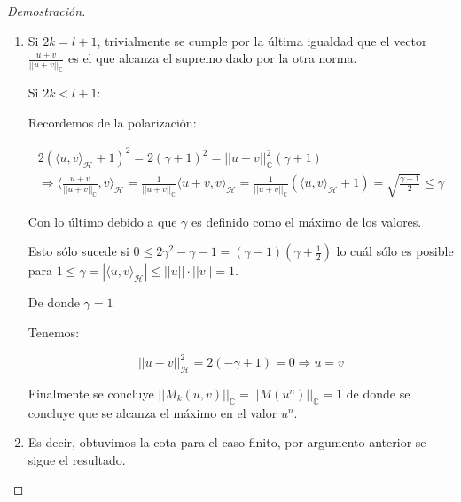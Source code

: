 \begin{proof}[Demostración]
\begin{enumerate}
		La conclusión de todo lo anterior se resume en:
		
		\begin{align*}
			||M((u+v)^{2k},v^{l+1-2k})||_{\mathbb{C}}  = ||u+v||^{2k}\\
			\Rightarrow ||M(\bigg(\frac{u+v}{||u+v||_{\mathbb{C}}}\bigg)^{2k},v^{l+1-2k})||_{\mathbb{C}} = 1 \\
			\Rightarrow (u+v,v)\in V
		\end{align*}
		
		\item   Si $2k = l+1$, trivialmente se cumple por la última igualdad que el vector $\frac{u+v}{||u+v||_{\mathbb{C}}}$ es el que alcanza el supremo dado por la otra norma.
		
		Si $2k<l+1$:
		
		Recordemos de la polarización:
		
		\begin{align*}
			2 (\langle u, v \rangle_\mathcal{H} + 1)^2 = 2(\gamma + 1)^2 = || u+v||_{\mathbb{C}}^{2} (\gamma + 1) \\
			\Rightarrow \langle \frac{u+v}{||u+v||_{\mathbb{C}}}, v \rangle_\mathcal{H} = \frac{1}{||u+v||_{\mathbb{C}}}\langle u+v, v \rangle_\mathcal{H} = \frac{1}{||u+v||_{\mathbb{C}}}(\langle u, v \rangle_\mathcal{H} + 1) =  \sqrt{\frac{\gamma + 1}{2}} \leq \gamma
		\end{align*}
		
		Con lo último debido a que $\gamma$ es definido como el máximo de los valores.
		
		Esto sólo sucede si $0 \leq 2\gamma^2-\gamma-1 = (\gamma - 1)(\gamma + \frac{1}{2})$ lo cuál sólo  es posible para $1\leq\gamma = |\langle u, v \rangle_\mathcal{H}| \leq ||u||\cdot||v|| = 1$.
		
		De donde $\gamma = 1$
		
		Tenemos:
		
		\begin{equation*}
			||u-v||_\mathcal{H}^2 = 2(-\gamma + 1) = 0 \Rightarrow u= v 
		\end{equation*}
		
		Finalmente se concluye $||M_k(u,v)||_\mathbb{C} = ||M(u^n)||_\mathbb{C}  = 1$ de donde se concluye que se alcanza el máximo en el valor $u^n$.
		
		\item Es decir, obtuvimos la cota para el caso finito, por argumento anterior se sigue el resultado.
	\end{enumerate} 
\end{proof}

